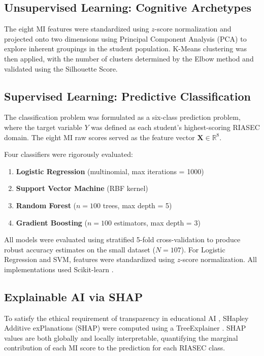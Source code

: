 \documentclass[12pt, a4paper]{article}
\begin{document}
\subsection{Unsupervised Learning: Cognitive Archetypes}

The eight MI features were standardized using $z$-score normalization and projected onto two dimensions using Principal Component Analysis (PCA) to explore inherent groupings in the student population. K-Means clustering was then applied, with the number of clusters determined by the Elbow method and validated using the Silhouette Score.

\subsection{Supervised Learning: Predictive Classification}

The classification problem was formulated as a six-class prediction problem, where the target variable $Y$ was defined as each student's highest-scoring RIASEC domain. The eight MI raw scores served as the feature vector $\mathbf{X} \in \mathbb{R}^{8}$.

Four classifiers were rigorously evaluated:
\begin{enumerate}
    \item \textbf{Logistic Regression} (multinomial, max iterations = 1000)
    \item \textbf{Support Vector Machine} (RBF kernel)
    \item \textbf{Random Forest} ($n=100$ trees, max depth = 5) \cite{breiman2001random}
    \item \textbf{Gradient Boosting} ($n=100$ estimators, max depth = 3)
\end{enumerate}

All models were evaluated using stratified 5-fold cross-validation to produce robust accuracy estimates on the small dataset ($N = 107$). For Logistic Regression and SVM, features were standardized using $z$-score normalization. All implementations used Scikit-learn \cite{pedregosa2011scikit}.

\subsection{Explainable AI via SHAP}

To satisfy the ethical requirement of transparency in educational AI \cite{guleria2022explainable}, SHapley Additive exPlanations (SHAP) were computed using a TreeExplainer \cite{lundberg2017unified}. SHAP values are both globally and locally interpretable, quantifying the marginal contribution of each MI score to the prediction for each RIASEC class.
\end{document}
